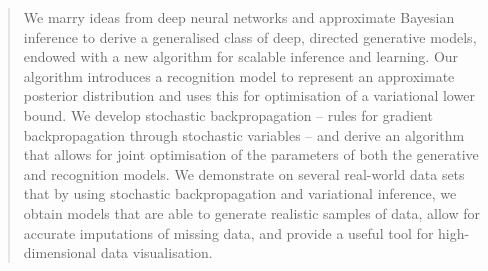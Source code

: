 \documentclass{article}
\renewcommand{\comment}[1]{\textcolor{red}{[#1]}}
\begin{document}
 


%

\begin{abstract} 
We marry ideas from deep neural networks and approximate Bayesian inference to derive a generalised class of deep, directed generative models, endowed with a new algorithm for scalable inference and learning. 
Our algorithm introduces a recognition model to represent an approximate posterior distribution and uses this for optimisation of a variational lower bound.
We develop stochastic backpropagation -- rules for gradient backpropagation through stochastic variables -- and
 derive an algorithm that allows for joint optimisation of the parameters of both the generative and recognition models.
We demonstrate on several real-world data sets that by using stochastic backpropagation and variational inference, we obtain models that are able to
generate realistic samples of data, allow for accurate imputations of missing data, and provide a useful tool for high-dimensional data visualisation.
\end{abstract} 
\vspace{-8mm}
\end{document}
